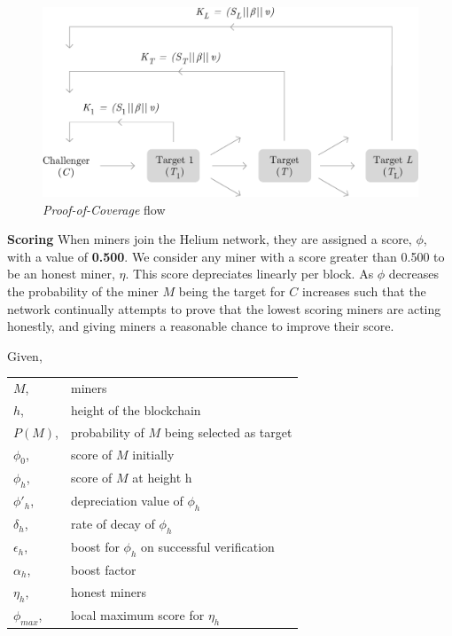 \documentclass[10pt, nonatbib, nocopyrightspace, reprint]{sigplanconf}
\begin{document}
\begin{figure}[H]
    \begin{center}
          \includegraphics[width=\columnwidth]{o_propagation.eps}
          \caption{\emph{Proof-of-Coverage} flow}
          \label{fig:poc-propogation}
     \end{center}
\end{figure}

\textbf{Scoring} \label{scores} When miners join the Helium network, they are assigned a score, $\phi$, with a value of \textbf{0.500}. We consider any miner with a score greater than 0.500 to be an honest miner, $\eta$. This score depreciates linearly per block. As $\phi$ decreases the probability of the miner $M$ being the target for $C$ increases such that the network continually attempts to prove that the lowest scoring miners are acting honestly, and giving miners a reasonable chance to improve their score.

Given,\newline
\begin{tabular}{l l}
        $M$,              & miners                                         \\
        $h$,          & height of the blockchain                       \\
        $P(M)$,       & probability of $M$ being selected as target    \\
        $\phi_0$,     & score of $M$ initially                         \\
        $\phi_h$,     & score of $M$ at height h                       \\
        $\phi'_h$,    & depreciation value of $\phi_h$                 \\
        $\delta_h$,   & rate of decay of $\phi_h$                      \\
        $\epsilon_h$, & boost for $\phi_h$ on successful verification  \\
        $\alpha_h$,   & boost factor                                   \\
        $\eta_h$,     & honest miners                                  \\
        $\phi_{max}$, & local maximum score for $\eta_h$               \\
\end{tabular}
\end{document}
